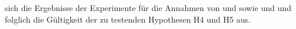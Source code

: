sich die Ergebnisse der Experimente für die Annahmen von \citet[22]{Paradis.1997} und \mbox{\citet[133]{Gutzmann.2019a}} sowie \mbox{\citet[315]{Lang.1983}} und \mbox{\citet[57]{Ortner.2014}} und folglich die Gültigkeit der zu testenden Hypothesen H4 und H5 aus.




